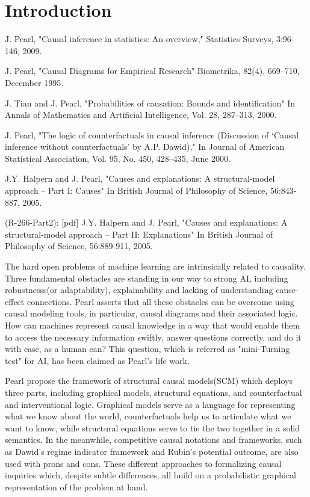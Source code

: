 \section{Introduction}



J. Pearl, "Causal inference in statistics: An overview,"  Statistics Surveys,  3:96--146, 2009.

J. Pearl, "Causal Diagrams for Empirical Research" Biometrika, 82(4), 669--710, December 1995.

J. Tian and J. Pearl, "Probabilities of causation: Bounds and identification"  In Annals of Mathematics and Artificial Intelligence, Vol. 28, 287--313, 2000. 

J. Pearl, "The logic of counterfactuals in causal inference (Discussion of `Causal inference without counterfactuals' by A.P. Dawid)," In Journal of American Statistical Association, Vol. 95, No. 450, 428--435, June 2000.


J.Y. Halpern and J. Pearl, "Causes and explanations: A structural-model approach
-- Part I:  Causes"  In British Journal of Philosophy of Science,  56:843-887, 2005.  

(R-266-Part2):  [pdf]
J.Y. Halpern and J. Pearl, "Causes and explanations: A structural-model approach
-- Part II: Explanations"    In British Journal of Philosophy of Science,  56:889-911, 2005.  




The hard open problems of machine learning are intrinsically related to causality\cite{Scholkopf2019}.  Three fundamental obstacles are standing in our way to strong AI, including robustnesss(or adaptability), explainability and lacking of understanding cause-effect connections.  Pearl  asserts that all these obstacles can be overcome using causal modeling tools, in particular, causal diagrams  and their associated logic\cite{Pearl2019seven}.  %
How can machines represent causal knowledge in a way that would enable them to access the necessary information swiftly, answer questions correctly, and do it with ease, as a human can? This question, which is referred as "mini-Turning test" for AI, has been claimed as Pearl's life work\cite{Pearl2018}. 


 

Pearl propose the framework of structural causal models(SCM) \cite{pearl2009causal, Pearl2009, halpern2005causesI, halpern2005causesII} which deploys three parts, including graphical models, structural equations, and counterfactual and interventional logic. Graphical models serve as a language for representing what we know about the world, counterfactuals help us to articulate what we want to know, while structural equations serve to tie the two together in a solid semantics. In the meanwhile, competitive causal notations and frameworks, such as Dawid's regime indicator framework and Rubin's potential outcome, are also used with prons and cons\cite{Marloes2018, MigualA.Hernan2019, Imbens2015}. These different approaches to formalizing causal inquiries which, despite subtle differences, all build on a probabilistic graphical representation of the problem at hand. 


